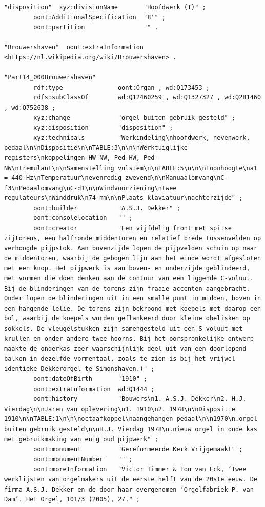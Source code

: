\begin{lstlisting}[caption={Part14\_000Brouwershaven}]
"disposition"  xyz:divisionName       "Hoofdwerk (I)" ;
        oont:AdditionalSpecification  "8'" ;
        oont:partition                "" .

"Brouwershaven"  oont:extraInformation  <https://nl.wikipedia.org/wiki/Brouwershaven> .

"Part14_000Brouwershaven"
        rdf:type               oont:Organ , wd:Q173453 ;
        rdfs:subClassOf        wd:Q12460259 , wd:Q1327327 , wd:Q281460 , wd:Q752638 ;
        xyz:change             "orgel buiten gebruik gesteld" ;
        xyz:disposition        "disposition" ;
        xyz:technicals         "Werkindeling\nhoofdwerk, nevenwerk, pedaal\n\nDispositie\n\nTABLE:3\n\n\nWerktuiglijke registers\nkoppelingen HW-NW, Ped-HW, Ped-NW\ntremulant\n\nSamenstelling vulstem\n\nTABLE:5\n\n\nToonhoogte\na1 = 440 Hz\nTemperatuur\nevenredig zwevend\n\nManuaalomvang\nC-f3\nPedaalomvang\nC-d1\n\nWindvoorziening\ntwee regulateurs\nWinddruk\n74 mm\n\nPlaats klaviatuur\nachterzijde" ;
        oont:builder           "A.S.J. Dekker" ;
        oont:consolelocation   "" ;
        oont:creator           "Een vijfdelig front met spitse zijtorens, een halfronde middentoren en relatief brede tussenvelden op verhoogde pijpstok. Aan bovenzijde lopen de pijpvelden schuin op naar de middentoren, waarbij de gebogen lijn aan het einde wordt afgesloten met een knop. Het pijpwerk is aan boven- en onderzijde geblindeerd, met vormen die doen denken aan de contour van een liggende C-voluut. Bij de blinderingen van de torens zijn fraaie accenten aangebracht. Onder lopen de blinderingen uit in een smalle punt in midden, boven in een hangende lelie. De torens zijn bekroond met koepels met daarop een bol, waarbij de koepels worden geflankeerd door kleine obelisken op sokkels. De vleugelstukken zijn samengesteld uit een S-voluut met krullen en onder andere twee hoorns. Bij het oorspronkelijke ontwerp maakte de onderkas zeer waarschijnlijk deel uit van een doorlopend balkon in dezelfde vormentaal, zoals te zien is bij het vrijwel identieke Dekkerorgel te Simonshaven.)" ;
        oont:dateOfBirth       "1910" ;
        oont:extraInformation  wd:Q1444 ;
        oont:history           "Bouwers\n1. A.S.J. Dekker\n2. H.J. Vierdag\n\nJaren van oplevering\n1. 1910\n2. 1978\n\nDispositie 1910\n\nTABLE:1\n\n\noctaafkoppel\naangehangen pedaal\n\n1970\n.orgel buiten gebruik gesteld\n\nH.J. Vierdag 1978\n.nieuw orgel in oude kas met gebruikmaking van enig oud pijpwerk" ;
        oont:monument          "Gereformeerde Kerk Vrijgemaakt" ;
        oont:monumentNumber    "" ;
        oont:moreInformation   "Victor Timmer & Ton van Eck, ‘Twee werklijsten van orgelmakers uit de eerste helft van de 20ste eeuw. De firma A.S.J. Dekker en de door haar overgenomen ‘Orgelfabriek P. van Dam’. Het Orgel, 101/3 (2005), 27." ;

\end{lstlisting}
